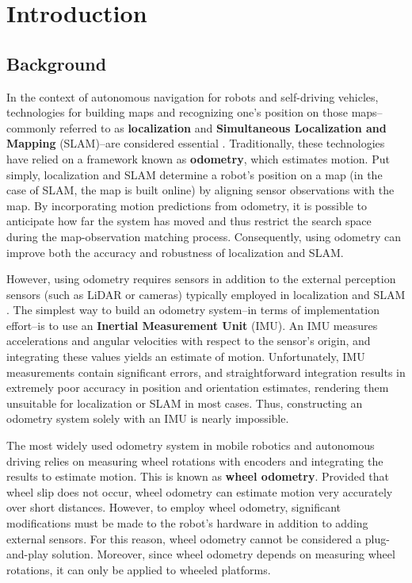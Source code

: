 \chapter{Introduction}

\section{Background}

In the context of autonomous navigation for robots and self-driving vehicles, technologies for building maps and recognizing one's position on those maps--commonly referred to as {\bf localization} and {\bf Simultaneous Localization and Mapping} (SLAM)--are considered essential \cite{Thrun:2005:PR:1121596}.
Traditionally, these technologies have relied on a framework known as {\bf odometry}, which estimates motion.
Put simply, localization and SLAM determine a robot's position on a map (in the case of SLAM, the map is built online) by aligning sensor observations with the map.
By incorporating motion predictions from odometry, it is possible to anticipate how far the system has moved and thus restrict the search space during the map-observation matching process.
Consequently, using odometry can improve both the accuracy and robustness of localization and SLAM.

However, using odometry requires sensors in addition to the external perception sensors (such as LiDAR or cameras) typically employed in localization and SLAM \cite{BorensteinJRS1997}.
The simplest way to build an odometry system--in terms of implementation effort--is to use an {\bf Inertial Measurement Unit} (IMU).
An IMU measures accelerations and angular velocities with respect to the sensor's origin, and integrating these values yields an estimate of motion.
Unfortunately, IMU measurements contain significant errors, and straightforward integration results in extremely poor accuracy in position and orientation estimates, rendering them unsuitable for localization or SLAM in most cases.
Thus, constructing an odometry system solely with an IMU is nearly impossible.

The most widely used odometry system in mobile robotics and autonomous driving relies on measuring wheel rotations with encoders and integrating the results to estimate motion.
This is known as {\bf wheel odometry}.
Provided that wheel slip does not occur, wheel odometry can estimate motion very accurately over short distances.
However, to employ wheel odometry, significant modifications must be made to the robot's hardware in addition to adding external sensors.
For this reason, wheel odometry cannot be considered a plug-and-play solution.
Moreover, since wheel odometry depends on measuring wheel rotations, it can only be applied to wheeled platforms.

